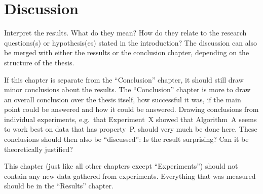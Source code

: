 \chapter{Discussion}\label{chap:discussion}

Interpret the results.
What do they mean?
How do they relate to the research questions(s) or hypothesis(es) stated in the introduction?
The discussion can also be merged with either the ressults or the conclusion chapter, depending on the structure of the thesis.

If this chapter is separate from the ``Conclusion'' chapter, it should still draw minor conclusions about the results.
The ``Conclusion'' chapter is more to draw an overall conclusion over the thesis itself, how successful it was, if the main point could be answered and how it could be answered.
Drawing conclusions from individual experiments, e.g.\ that Experiment~X showed that Algorithm~A seems to work best on data that has property~P, should very much be done here.
These conclusions should then also be ``discussed'':
Is the result surprising?
Can it be theoretically justified?

This chapter (just like all other chapters except ``Experiments'') should not contain any new data gathered from experiments.
Everything that was measured should be in the ``Results'' chapter.
